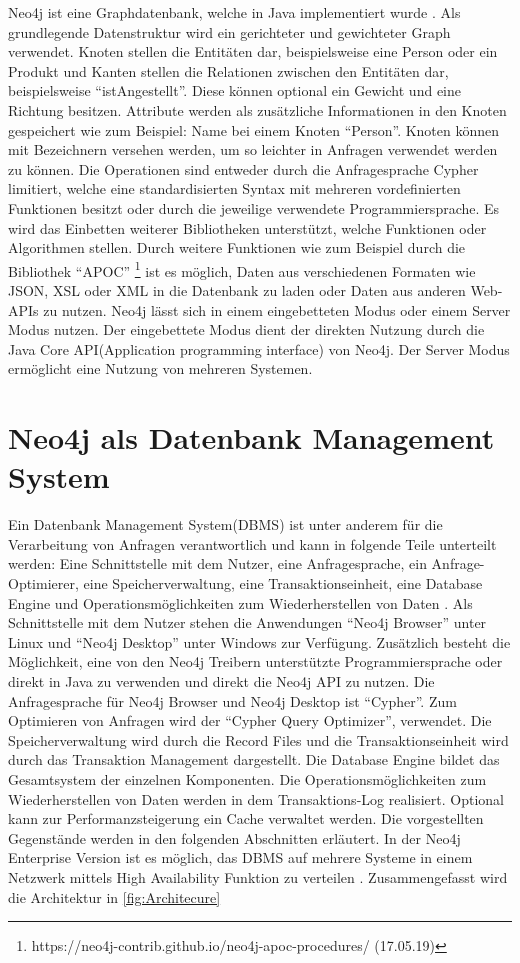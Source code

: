 Neo4j ist eine Graphdatenbank, welche in Java implementiert wurde \parencite{vukotic2015neo4j}. Als grundlegende Datenstruktur wird ein gerichteter und gewichteter Graph verwendet. Knoten stellen die Entitäten dar, beispielsweise eine Person oder ein Produkt und  Kanten stellen die Relationen zwischen den Entitäten dar, beispielsweise “istAngestellt”. Diese können optional ein Gewicht und eine Richtung besitzen. Attribute werden als zusätzliche Informationen in den Knoten gespeichert wie zum Beispiel: Name bei einem Knoten “Person”. Knoten können mit Bezeichnern versehen werden, um so leichter in Anfragen  verwendet werden zu können. Die Operationen sind entweder durch die  Anfragesprache  Cypher limitiert, welche eine standardisierten Syntax mit  mehreren vordefinierten Funktionen besitzt oder durch die jeweilige verwendete Programmiersprache. Es wird das Einbetten weiterer Bibliotheken unterstützt, welche  Funktionen oder Algorithmen stellen. Durch weitere Funktionen wie zum Beispiel durch die Bibliothek “APOC” \footnote{https://neo4j-contrib.github.io/neo4j-apoc-procedures/ (17.05.19) } ist es möglich, Daten aus verschiedenen Formaten wie JSON, XSL oder XML in die Datenbank zu laden oder Daten aus anderen Web-APIs zu nutzen. Neo4j lässt sich in einem  eingebetteten Modus oder einem  Server Modus nutzen. Der eingebettete Modus dient der direkten  Nutzung durch die Java Core API(Application programming interface) von Neo4j. Der Server Modus ermöglicht eine Nutzung von mehreren Systemen. 

\section{Neo4j als Datenbank Management System}
Ein Datenbank Management System(DBMS) ist unter anderem für die Verarbeitung von Anfragen verantwortlich und kann in folgende Teile unterteilt werden: Eine Schnittstelle mit dem Nutzer, eine Anfragesprache, ein Anfrage-Optimierer,  eine Speicherverwaltung, eine Transaktionseinheit, eine Database Engine und Operationsmöglichkeiten zum Wiederherstellen von Daten \parencite{angles2012comparison}. Als Schnittstelle mit dem Nutzer stehen die Anwendungen “Neo4j Browser” unter Linux und “Neo4j Desktop” unter Windows zur Verfügung. Zusätzlich besteht die Möglichkeit, eine von den Neo4j Treibern unterstützte Programmiersprache  oder direkt in Java zu verwenden und direkt die Neo4j API zu nutzen. Die Anfragesprache für Neo4j Browser und Neo4j Desktop ist “Cypher”. Zum Optimieren von Anfragen wird der “Cypher Query Optimizer”, verwendet. Die Speicherverwaltung wird durch die Record Files und die Transaktionseinheit  wird durch das Transaktion Management dargestellt. Die Database Engine bildet das Gesamtsystem der einzelnen Komponenten. Die Operationsmöglichkeiten zum Wiederherstellen von Daten werden in dem Transaktions-Log realisiert. Optional kann zur  Performanzsteigerung ein Cache verwaltet werden. Die vorgestellten Gegenstände werden in den folgenden Abschnitten erläutert. In der Neo4j Enterprise Version ist es möglich, das DBMS auf mehrere Systeme in einem Netzwerk mittels High Availability Funktion zu verteilen \parencite{vukotic2015neo4j}. Zusammengefasst wird die Architektur in \ref{fig:Architecure}

